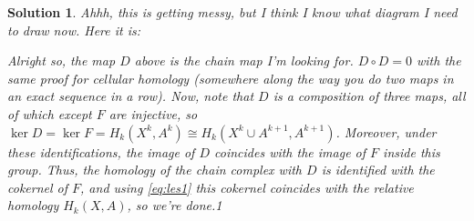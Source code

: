 \documentclass{article}
\theoremstyle{plain}
\theoremstyle{nonumberplain}
\newtheorem{sol}{Solution}
\begin{document}
\begin{sol}
Ahhh, this is getting messy, but I think I know what diagram I need to draw now. Here it is:
\begin{figure}[H]
\centering
{}
\end{figure}

Alright so, the map $D$ above is the chain map I'm looking for. $D \circ D = 0$ with the same proof for cellular homology (somewhere along the way you do two maps in an exact sequence in a row). Now, note that $D$ is a composition of three maps, all of which except $F$ are injective, so $\ker D = \ker F = H_k(X^k, A^k) \cong H_k(X^k \cup A^{k+1}, A^{k+1})$. Moreover, under these identifications, the image of $D$ coincides with the image of $F$ inside this group. Thus, the homology of the chain complex with $D$ is identified with the cokernel of $F$, and using \eqref{eq:les1} this cokernel coincides with the relative homology $H_k(X,A)$, so we're done.1\
\end{sol}
\end{document}

